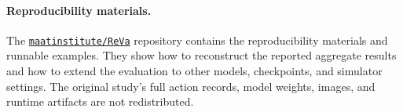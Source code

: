 \documentclass{article}
\begin{document}
{\paragraph{Reproducibility materials.}
The \href{https://github.com/maatinstitute/ReVa}{\texttt{maatinstitute/ReVa}}
repository contains the reproducibility materials and runnable examples. They
show how to reconstruct the reported aggregate results and how to extend the
evaluation to other models, checkpoints, and simulator settings. The original
study's full action records, model weights, images, and runtime artifacts are
not redistributed.
}
\end{document}
